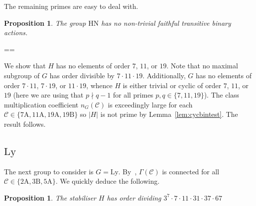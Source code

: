 \documentclass[11pt, a4paper]{amsart}
\makeatletter
\newtheorem{prop}[thm]{Proposition}
\renewcommand{\proofname}{Proof}
\renewenvironment{proof}[1][\proofname]{\par
  \pushQED{\qed}  \normalfont \partopsep=\z@skip \topsep=\z@skip
  \trivlist
  \item[\hskip\labelsep
        \scshape
    #1\@addpunct{.}]\ignorespaces
}{  \popQED\endtrivlist\@endpefalse
}
\makeatother
\begin{document}
The remaining primes are easy to deal with.

\begin{prop}
    The group $\mathrm{HN}$ has no non-trivial faithful transitive binary actions.
\end{prop}
\begin{proof}
    We show that $H$ has no elements of order $7$, $11$, or $19$. Note that no maximal subgroup of $G$ has order divisible by $7\cdot11\cdot19$. Additionally, $G$ has no elements of order $7\cdot 11$, $7\cdot19$, or $11\cdot 19$, whence $H$ is either trivial or cyclic of order $7$, $11$, or $19$ (here we are using that $p\nmid q-1$ for all primes $p,q\in\{7,11,19\}$). The class multiplication coefficient $n_G(\mathcal{C})$ is exceedingly large for each $\mathcal{C}\in\{\mathrm{7A,11A,19A,19B}\}$ so $|H|$ is not prime by Lemma~\ref{lem:cycbintest}. The result follows.
\end{proof}

\subsection{$\mathrm{Ly}$} The next group to consider is $G=\mathrm{Ly}$. By~\cite[Propositions 3.1, 3.2, and 3.3]{CDP}, $\Gamma(\mathcal{C})$ is connected for all $\mathcal{C}\in\{\mathrm{2A},\mathrm{3B},\mathrm{5A}\}$. We quickly deduce the following.
\begin{prop}
    The stabiliser $H$ has order dividing $3^7\cdot 7\cdot 11\cdot 31\cdot37\cdot 67$
\end{prop}
\end{document}
